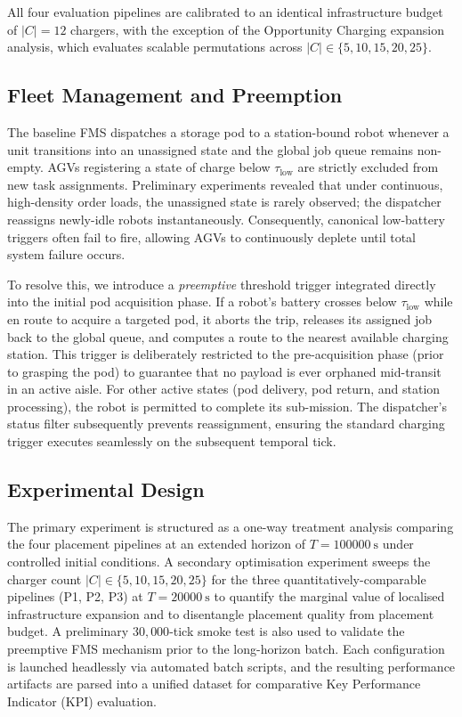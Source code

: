 \documentclass[conference]{IEEEtran}
\begin{document}
All four evaluation pipelines are calibrated to an identical infrastructure budget of $|C| = 12$ chargers, with the exception of the Opportunity Charging expansion analysis, which evaluates scalable permutations across $|C| \in \{5, 10, 15, 20, 25\}$.

\subsection{Fleet Management and Preemption}
\label{sec:preemption}
The baseline FMS dispatches a storage pod to a station-bound robot whenever a unit transitions into an unassigned state and the global job queue remains non-empty. AGVs registering a state of charge below $\tau_\text{low}$ are strictly excluded from new task assignments. Preliminary experiments revealed that under continuous, high-density order loads, the unassigned state is rarely observed; the dispatcher reassigns newly-idle robots instantaneously. Consequently, canonical low-battery triggers often fail to fire, allowing AGVs to continuously deplete until total system failure occurs.

To resolve this, we introduce a \emph{preemptive} threshold trigger integrated directly into the initial pod acquisition phase. If a robot's battery crosses below $\tau_\text{low}$ while en route to acquire a targeted pod, it aborts the trip, releases its assigned job back to the global queue, and computes a route to the nearest available charging station. This trigger is deliberately restricted to the pre-acquisition phase (prior to grasping the pod) to guarantee that no payload is ever orphaned mid-transit in an active aisle. For other active states (pod delivery, pod return, and station processing), the robot is permitted to complete its sub-mission. The dispatcher's status filter subsequently prevents reassignment, ensuring the standard charging trigger executes seamlessly on the subsequent temporal tick.

\subsection{Experimental Design}
\label{sec:design}
The primary experiment is structured as a one-way treatment analysis comparing the four placement pipelines at an extended horizon of $T = \SI{100000}{\second}$ under controlled initial conditions. A secondary optimisation experiment sweeps the charger count $|C| \in \{5, 10, 15, 20, 25\}$ for the three quantitatively-comparable pipelines (P1, P2, P3) at $T = \SI{20000}{\second}$ to quantify the marginal value of localised infrastructure expansion and to disentangle placement quality from placement budget. A preliminary $30{,}000$-tick smoke test is also used to validate the preemptive FMS mechanism prior to the long-horizon batch. Each configuration is launched headlessly via automated batch scripts, and the resulting performance artifacts are parsed into a unified dataset for comparative Key Performance Indicator (KPI) evaluation.
\end{document}
